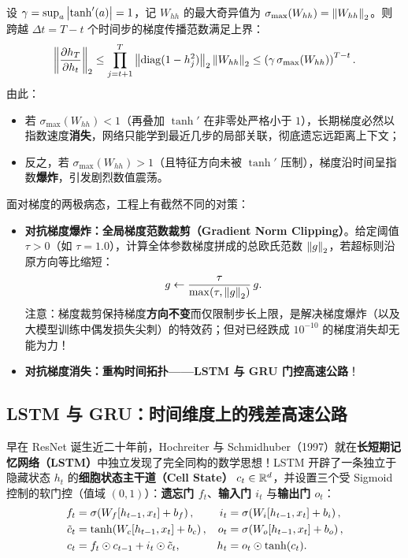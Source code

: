 \begin{thmBox}
\begin{proposition}
\label{prop:bptt-spectral}
设 $\gamma = \sup_a \left|\tanh'(a)\right| = 1$，记 $W_{hh}$ 的最大奇异值为 $\sigma_{\max}(W_{hh}) = \left\|W_{hh}\right\|_2$。则跨越 $\Delta t = T - t$ 个时间步的梯度传播范数满足上界：
\begin{equation}
  \left\|\frac{\partial h_T}{\partial h_t}\right\|_2
  \le \prod_{j=t+1}^{T} \left\|\operatorname{diag}(1 - h_j^2)\right\|_2 \left\|W_{hh}\right\|_2
  \le \left(\gamma\,\sigma_{\max}(W_{hh})\right)^{T - t}.
  \label{eq:bptt-bound}
\end{equation}
由此：
\begin{itemize}
  \item 若 $\sigma_{\max}(W_{hh}) < 1$（再叠加 $\tanh'$ 在非零处严格小于 $1$），长期梯度必然以指数速度\textbf{消失}，网络只能学到最近几步的局部关联，彻底遗忘远距离上下文；
  \item 反之，若 $\sigma_{\max}(W_{hh}) > 1$（且特征方向未被 $\tanh'$ 压制），梯度沿时间呈指数\textbf{爆炸}，引发剧烈数值震荡。
\end{itemize}
\end{proposition}
\end{thmBox}

面对梯度的两极病态，工程上有截然不同的对策：
\begin{itemize}
  \item \textbf{对抗梯度爆炸：全局梯度范数裁剪（Gradient Norm Clipping）}。给定阈值 $\tau > 0$（如 $\tau = 1.0$），计算全体参数梯度拼成的总欧氏范数 $\left\|g\right\|_2$，若超标则沿原方向等比缩短：
  \[
    g \leftarrow \frac{\tau}{\max(\tau, \left\|g\right\|_2)}\, g.
  \]
  注意：梯度裁剪保持梯度\textbf{方向不变}而仅限制步长上限，是解决梯度爆炸（以及大模型训练中偶发损失尖刺）的特效药；但对已经跌成 $10^{-10}$ 的梯度消失却无能为力！
  \item \textbf{对抗梯度消失：重构时间拓扑——LSTM 与 GRU 门控高速公路}！
\end{itemize}

\subsection{LSTM 与 GRU：时间维度上的残差高速公路}

早在 ResNet 诞生近二十年前，Hochreiter 与 Schmidhuber（1997）就在\textbf{长短期记忆网络（LSTM）}中独立发现了完全同构的数学思想！LSTM 开辟了一条独立于隐藏状态 $h_t$ 的\textbf{细胞状态主干道（Cell State）} $c_t \in \mathbb{R}^d$，并设置三个受 Sigmoid 控制的软门控（值域 $(0,1)$）：\textbf{遗忘门 $f_t$}、\textbf{输入门 $i_t$} 与\textbf{输出门 $o_t$}：
\begin{align}
  f_t &= \sigma\!\left(W_f [h_{t-1}, x_t] + b_f\right), &
  i_t &= \sigma\!\left(W_i [h_{t-1}, x_t] + b_i\right), \label{eq:lstm-gates1} \\
  \tilde{c}_t &= \tanh\!\left(W_c [h_{t-1}, x_t] + b_c\right), &
  o_t &= \sigma\!\left(W_o [h_{t-1}, x_t] + b_o\right), \label{eq:lstm-gates2} \\
  c_t &= f_t \odot c_{t-1} + i_t \odot \tilde{c}_t, &
  h_t &= o_t \odot \tanh(c_t). \label{eq:lstm-cell}
\end{align}

